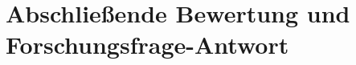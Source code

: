 \label{subsubsec:precaut_leitlinie}

\label{subsubsec:systemic_change}

\section{Abschließende Bewertung und Forschungsfrage-Antwort}
\label{sec:abschließend}


\label{subsec:zentraleerkn}


\label{subsec:ausblick}

\label{subsubsec:future_scenarios}

